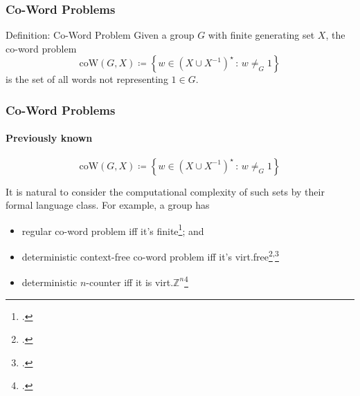 \documentclass[11pt]{beamer}
\begin{document}

\begin{frame}
\frametitle{Co-Word Problems}

\begin{block}{Definition: Co-Word Problem}
Given a group $G$ with finite generating set $X$, the co-word problem
\[
	\mathrm{coW}(G,X)
	\coloneqq
	\left\{
	w \in \left(X \cup X^{-1} \right)^\star
	\, :\,
	w \neq_G 1
	\right\}
\]
is the set of all words not representing $1 \in G$.
\end{block}

\end{frame}


\begin{frame}[t]
\frametitle{Co-Word Problems}
\framesubtitle{\large Previously known}

\begin{definition}
\[
\mathrm{coW}(G,X)
\coloneqq
\left\{
w \in \left(X \cup X^{-1} \right)^\star
\, :\,
w \neq_G 1
\right\}
\]
\end{definition}

\vspace*{1em}

It is natural to consider the computational complexity of such sets by their formal language class.
For example, a group has

\begin{itemize}
	\item
	regular co-word problem iff it's finite\footcite{anisimov1971}; and
	
	\item
	deterministic context-free co-word problem iff it's virt.\@ free\footcite{muller1983}\textsuperscript{,}\footcite{muller1985}
	
	\item
	deterministic $n$-counter iff it is virt.\@ $\mathbb{Z}^n$\!\!\!\phantom{m}\footcite{elder2008}
\end{itemize}

\end{frame}
\end{document}
